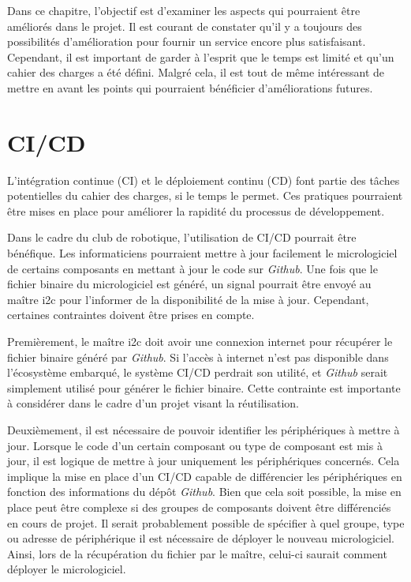 Dans ce chapitre, l'objectif est d'examiner les aspects qui pourraient être améliorés dans le projet.
Il est courant de constater qu'il y a toujours des possibilités d'amélioration pour fournir un service encore plus satisfaisant.
Cependant, il est important de garder à l'esprit que le temps est limité et qu'un cahier des charges a été défini.
Malgré cela, il est tout de même intéressant de mettre en avant les points qui pourraient bénéficier d'améliorations futures.

\section{CI/CD}

L'intégration continue (CI) et le déploiement continu (CD) font partie des tâches potentielles du cahier des charges, si le temps le permet.
Ces pratiques pourraient être mises en place pour améliorer la rapidité du processus de développement.

Dans le cadre du club de robotique, l'utilisation de CI/CD pourrait être bénéfique.
Les informaticiens pourraient mettre à jour facilement le micrologiciel de certains composants en mettant à jour le code sur \textit{Github}.
Une fois que le fichier binaire du micrologiciel est généré, un signal pourrait être envoyé au maître \gls{i2c} pour l'informer de la disponibilité de la mise à jour.
Cependant, certaines contraintes doivent être prises en compte.

Premièrement, le maître \gls{i2c} doit avoir une connexion internet pour récupérer le fichier binaire généré par \textit{Github}.
Si l'accès à internet n'est pas disponible dans l'écosystème embarqué, le système CI/CD perdrait son utilité, et \textit{Github} serait simplement utilisé pour générer le fichier binaire.
Cette contrainte est importante à considérer dans le cadre d'un projet visant la réutilisation.

Deuxièmement, il est nécessaire de pouvoir identifier les périphériques à mettre à jour.
Lorsque le code d'un certain composant ou type de composant est mis à jour, il est logique de mettre à jour uniquement les périphériques concernés.
Cela implique la mise en place d'un CI/CD capable de différencier les périphériques en fonction des informations du dépôt \textit{Github}.
Bien que cela soit possible, la mise en place peut être complexe si des groupes de composants doivent être différenciés en cours de projet. Il serait probablement possible de spécifier à quel groupe, type ou adresse de périphérique il est nécessaire de déployer le nouveau micrologiciel.
Ainsi, lors de la récupération du fichier par le maître, celui-ci saurait comment déployer le micrologiciel.

